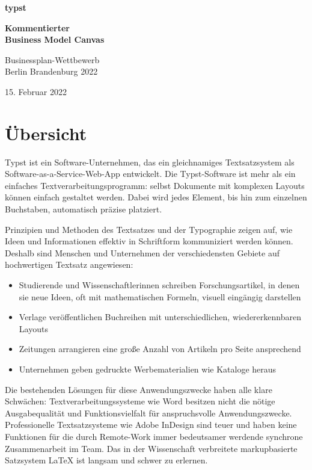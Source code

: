 \documentclass[11pt, a4paper]{article}
\newcommand{\gender}{\raisebox{-.25em}{*}}
\let\oldsection\section
\renewcommand\section{\clearpage\oldsection}
\renewcommand{\glossary} {\marginsymbol{$\hookrightarrow$}}
\newcommand{\marginsymbol}[1] {\protect\marginsymbolhelper{#1}}
\newcommand{\marginsymbolhelper}[1] {\tabto*{-1cm}\makebox[0cm]{#1}\tabto*{\TabPrevPos}}
\begin{document}
\raggedright
\pagecolor{eastern}
\mbox{}
\vfill
{
\color{white}
\LARGE
\textbf{\fontsize{50}{60}\selectfont typst}
\vspace{1cm}

\textbf{Kommentierter \\ Business Model Canvas}

{
\Large
Businessplan-Wettbewerb \\
Berlin Brandenburg 2022 

15. Februar 2022
}
\vspace{2.25cm}
}
\section*{Übersicht}
\NoBgThispage
\vspace{2mm}

Typst ist ein Software-Unternehmen, das ein gleichnamiges Textsatzsystem als Software-as-a-Service-Web-App entwickelt. Die Typst-Software ist mehr als ein einfaches Textverarbeitungsprogramm: selbst Dokumente mit komplexen Layouts können einfach gestaltet werden. Dabei wird jedes Element, bis hin zum einzelnen Buchstaben, automatisch präzise platziert.

Prinzipien und Methoden des Textsatzes und der Typographie zeigen auf, wie Ideen und Informationen effektiv in Schriftform kommuniziert werden können. Deshalb sind Menschen und Unternehmen der verschiedensten Gebiete auf hochwertigen Textsatz angewiesen:
\begin{itemize}
    \item Studierende und Wissenschaftler\gender{}innen schreiben Forschungsartikel, in denen sie neue Ideen, oft mit mathematischen Formeln, visuell eingängig darstellen
    \item Verlage veröffentlichen Buchreihen mit unterschiedlichen, wiedererkennbaren Layouts
    \item Zeitungen arrangieren eine große Anzahl von Artikeln pro Seite ansprechend
    \item Unternehmen geben gedruckte Werbematerialien wie Kataloge heraus
\end{itemize}

Die bestehenden Lösungen für diese Anwendungszwecke haben alle klare Schwächen: Textverarbeitungssysteme wie Word besitzen nicht die nötige Ausgabequalität und Funktionsvielfalt für anspruchsvolle Anwendungszwecke. Professionelle Textsatzsysteme wie Adobe InDesign sind teuer und haben keine Funktionen für die durch Remote-Work immer bedeutsamer werdende synchrone Zusammenarbeit im Team. Das in der Wissenschaft verbreitete \glossary markupbasierte Satzsystem LaTeX ist langsam und schwer zu erlernen.
\end{document}
